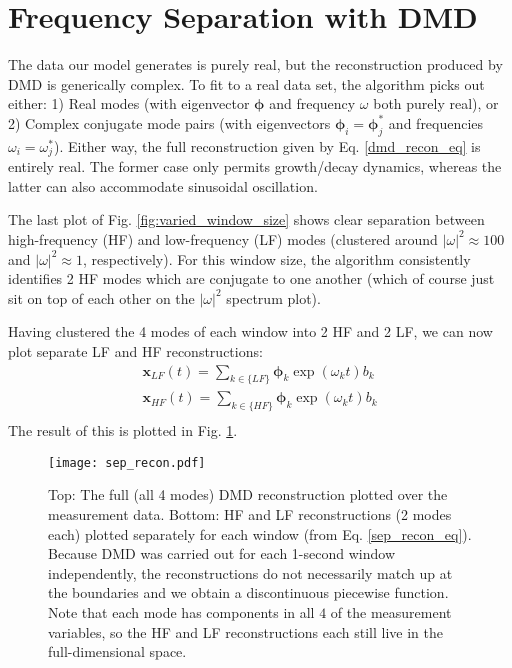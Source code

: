 \documentclass[11pt]{article} %
\begin{document}
\section{Frequency Separation with DMD}
The data our model generates is purely real, but the reconstruction produced by DMD is generically complex. To fit to a real data set, the algorithm picks out either: 1) Real modes (with eigenvector $\bm{\phi}$ and frequency $\omega$ both purely real), or 2) Complex conjugate mode pairs (with eigenvectors $\bm{\phi}_i = \bm{\phi}_j^*$ and frequencies $\omega_i = \omega_j^*$). Either way, the full reconstruction given by Eq. \ref{dmd_recon_eq} is entirely real. The former case only permits growth/decay dynamics, whereas the latter can also accommodate sinusoidal oscillation.

The last plot of Fig. \ref{fig:varied_window_size} shows clear separation between high-frequency (HF) and low-frequency (LF) modes (clustered around $|\omega|^2 \approx 100$ and $|\omega|^2 \approx 1$, respectively). For this window size, the algorithm consistently identifies 2 HF modes which are conjugate to one another (which of course just sit on top of each other on the $|\omega|^2$ spectrum plot).

Having clustered the 4 modes of each window into 2 HF and 2 LF, we can now plot separate LF and HF reconstructions:
\begin{equation}
\begin{split}
\label{sep_recon_eq}
\bm{x}_{LF}(t) = \sum_{k\in\{LF\}} \bm{\phi}_k \exp(\omega_k t) b_k\\
\bm{x}_{HF}(t) = \sum_{k\in\{HF\}} \bm{\phi}_k \exp(\omega_k t) b_k\\
\end{split}
\end{equation}
The result of this is plotted in Fig. \ref{fig:freq_sep_recon}.

\begin{figure}
\centering
\texttt{[image: sep\_recon.pdf]}
\caption{Top: The full  (all 4 modes) DMD reconstruction plotted over the measurement data. Bottom: HF and LF reconstructions (2 modes each) plotted separately for each window (from Eq. \ref{sep_recon_eq}). Because DMD was carried out for each 1-second window independently, the reconstructions do not necessarily match up at the boundaries and we obtain a discontinuous piecewise function. Note that each mode has components in all $4$ of the measurement variables, so the HF and LF reconstructions each still live in the full-dimensional space.}
\label{fig:freq_sep_recon}
\end{figure}
\end{document}
